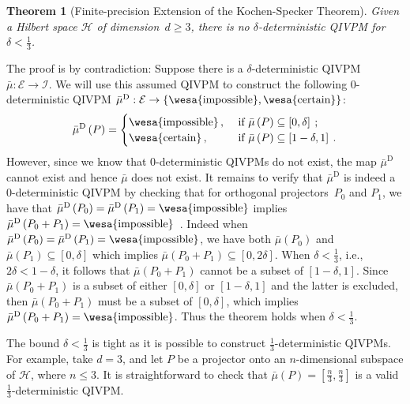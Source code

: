 \documentclass[english,reprint, aps, prl,superscriptaddress, showpacs,
showkeys, longbibliography, amsmath, amssymb, floatfix]{revtex4-1}
\theoremstyle{plain}
\newtheorem{thm}{Theorem}
\theoremstyle{definition}
\newcommand{\Hilb}{\mathcal{H}}
\newcommand{\events}{\ensuremath{\mathcal{E}}}
\newcommand{\imposs}{{\text{\wesa{impossible}}}}
\newcommand{\necess}{{\text{\wesa{certain}}}}
\begin{document}
\begin{thm}[Finite-precision Extension of the Kochen-Specker
  Theorem] \label{cor:Kochen-Specker-IVPM} Given a Hilbert space
  $\Hilb$ of dimension~$d\ge3$, there is no $\delta$-deterministic
  QIVPM for $\delta<\frac{1}{3}$.\end{thm}

The proof is by contradiction: Suppose there is a
$\delta$-deterministic
QIVPM~$\bar{\mu}:\events\rightarrow\mathscr{I}$. We will use this
assumed QIVPM to construct the following 0-deterministic QIVPM
$\bar{\mu}^{\textrm{D}}:\events\rightarrow\left\{
  \imposs,\necess\right\}$:
\[
\bar{\mu}^{\textrm{D}}\left(P\right)=\begin{cases}
\imposs\,, & \textrm{ if }\bar{\mu}\left(P\right)\subseteq\left[0,\delta\right]\:;\\
\necess\,, & \textrm{ if }\bar{\mu}\left(P\right)\subseteq\left[1-\delta,1\right]\:.
\end{cases}
\]
However, since we know that 0-deterministic QIVPMs do not exist, the
map $\bar{\mu}^{\textrm{D}}$ cannot exist and hence $\bar{\mu}$ does
not exist. It remains to verify that $\bar{\mu}^{\textrm{D}}$ is
indeed a 0-deterministic QIVPM by checking that for orthogonal
projectors~$P_{0}$ and $P_{1}$, we have that
$\bar{\mu}^{\textrm{D}}\left(P_{0}\right)=\bar{\mu}^{\textrm{D}}\left(P_{1}\right)=\imposs$
implies
$\bar{\mu}^{\textrm{D}}\left(P_{0}+P_{1}\right)=\imposs$~\citep{TaiThesis2018}. Indeed
when
$\bar{\mu}^{\textrm{D}}\left(P_{0}\right)=\bar{\mu}^{\textrm{D}}\left(P_{1}\right)=\imposs$,
we have both $\bar{\mu}\left(P_{0}\right)$ and
$\bar{\mu}\left(P_{1}\right)\subseteq\left[0,\delta\right]$ which
implies
$\bar{\mu}\left(P_{0}+P_{1}\right)\subseteq\left[0,2\delta\right]$.
When $\delta<\frac{1}{3}$, i.e., $2\delta<1-\delta$, it follows that
$\bar{\mu}\left(P_{0}+P_{1}\right)$ cannot be a subset of
$\left[1-\delta,1\right]$. Since $\bar{\mu}\left(P_{0}+P_{1}\right)$
is a subset of either $\left[0,\delta\right]$ or
$\left[1-\delta,1\right]$ and the latter is excluded, then
$\bar{\mu}\left(P_{0}+P_{1}\right)$ must be a subset of
$\left[0,\delta\right]$, which implies
$\bar{\mu}^{\textrm{D}}\left(P_{0}+P_{1}\right)=\imposs$. Thus the
theorem holds when $\delta<\frac{1}{3}$.

The bound $\delta < \frac{1}{3}$ is tight as it is possible to
construct $\frac{1}{3}$-deterministic QIVPMs. For example, take $d=3$,
and let $P$ be a projector onto an $n$-dimensional subspace of
$\Hilb$, where $n \leq 3$. It is straightforward to check that
$\bar{\mu}\left(P\right)=\left[\frac{n}{3},\frac{n}{3}\right]$ is a
valid $\frac{1}{3}$-deterministic QIVPM.
\end{document}
